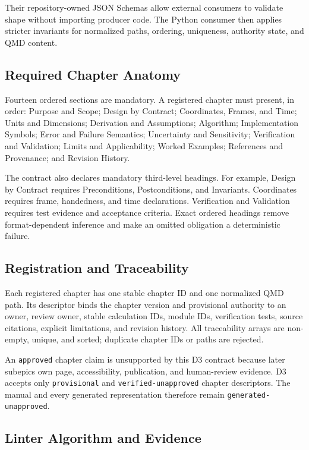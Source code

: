 \documentclass[
  american,
]{article}
\begin{document}
Their repository-owned JSON Schemas allow external consumers to validate
shape without importing producer code. The Python consumer then applies
stricter invariants for normalized paths, ordering, uniqueness,
authority state, and QMD content.

\subsection{Required Chapter Anatomy}\label{required-chapter-anatomy}

Fourteen ordered sections are mandatory. A registered chapter must
present, in order: Purpose and Scope; Design by Contract; Coordinates,
Frames, and Time; Units and Dimensions; Derivation and Assumptions;
Algorithm; Implementation Symbols; Error and Failure Semantics;
Uncertainty and Sensitivity; Verification and Validation; Limits and
Applicability; Worked Examples; References and Provenance; and Revision
History.

The contract also declares mandatory third-level headings. For example,
Design by Contract requires Preconditions, Postconditions, and
Invariants. Coordinates requires frame, handedness, and time
declarations. Verification and Validation requires test evidence and
acceptance criteria. Exact ordered headings remove format-dependent
inference and make an omitted obligation a deterministic failure.

\subsection{Registration and
Traceability}\label{registration-and-traceability}

Each registered chapter has one stable chapter ID and one normalized QMD
path. Its descriptor binds the chapter version and provisional authority
to an owner, review owner, stable calculation IDs, module IDs,
verification tests, source citations, explicit limitations, and revision
history. All traceability arrays are non-empty, unique, and sorted;
duplicate chapter IDs or paths are rejected.

An \texttt{approved} chapter claim is unsupported by this D3 contract
because later subepics own page, accessibility, publication, and
human-review evidence. D3 accepts only \texttt{provisional} and
\texttt{verified-unapproved} chapter descriptors. The manual and every
generated representation therefore remain \texttt{generated-unapproved}.

\subsection{Linter Algorithm and
Evidence}\label{linter-algorithm-and-evidence}
\end{document}
